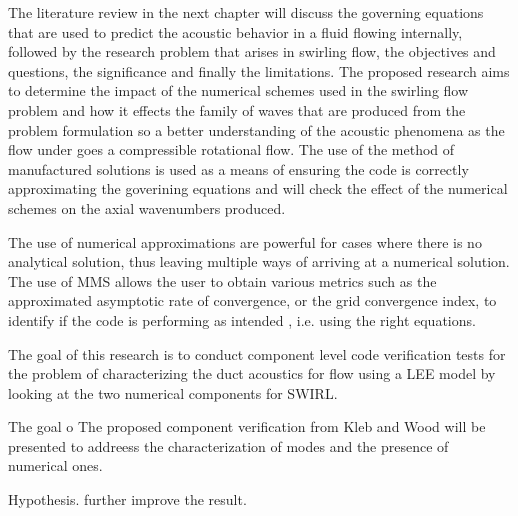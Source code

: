 The literature review in the next chapter will discuss the governing equations that are
used to predict the acoustic behavior in a fluid flowing internally, followed 
by the research problem that arises in swirling flow, the objectives and 
questions, the significance and finally the limitations.  The proposed research aims to determine the impact of the numerical schemes used
in the swirling flow problem and how it effects the family of waves that are
produced from the problem formulation so a better understanding of the 
acoustic phenomena as the flow under goes a compressible rotational flow. The use
of the method of manufactured solutions is used as a means of ensuring the code is
correctly approximating the goverining equations and will check the effect of the numerical schemes
on the axial wavenumbers produced.
 

The use of numerical approximations are powerful for cases where 
there is no analytical solution, thus leaving multiple ways of arriving at a
numerical solution. The use of MMS allows the user to obtain various metrics
such as the approximated asymptotic rate of convergence, or the grid convergence index,
to identify if the code is performing as intended , i.e. using the right equations.


The goal of this research is to conduct component level code verification tests 
for the problem of characterizing the duct acoustics for flow using a LEE model 
by looking at the two numerical components for SWIRL.


The goal o
The proposed component verification from Kleb and Wood will 
be presented to addreess the characterization of 
modes and the presence of numerical ones. 

Hypothesis.
further improve the result. 


